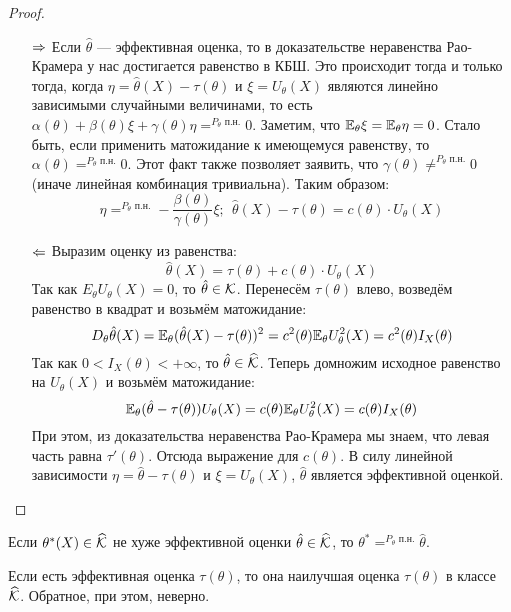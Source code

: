 \begin{proof}~
	\begin{itemize}
		\item[$\Rightarrow$] Если $\hat{\theta}$ --- эффективная оценка, то в доказательстве неравенства Рао-Крамера у нас достигается равенство в КБШ. Это происходит тогда и только тогда, когда $\eta = \hat{\theta}(X) - \tau(\theta)$ и $\xi = U_\theta(X)$ являются линейно зависимыми случайными величинами, то есть $\alpha(\theta) + \beta(\theta)\xi + \gamma(\theta)\eta =^{P_\theta\text{ п.н.}} 0$. Заметим, что $\mathbb{E}_\theta \xi = \mathbb{E}_\theta \eta = 0$. Стало быть, если применить матожидание к имеющемуся равенству, то $\alpha(\theta) =^{P_\theta\text{ п.н.}} 0$. Этот факт также позволяет заявить, что $\gamma(\theta) \neq^{P_\theta\text{ п.н.}} 0$ (иначе линейная комбинация тривиальна). Таким образом:
		\[
			\eta =^{P_\theta\text{ п.н.}} -\frac{\beta(\theta)}{\gamma(\theta)}\xi;\ \ \hat{\theta}(X) - \tau(\theta) = c(\theta) \cdot U_\theta(X)
		\]
		
		\item[$\Leftarrow$] Выразим оценку из равенства:
		\[
			\hat{\theta}(X) = \tau(\theta) + c(\theta) \cdot U_\theta(X)
		\]
		Так как $E_\theta U_\theta(X) = 0$, то $\hat{\theta} \in \mathcal{K}$. Перенесём $\tau(\theta)$ влево, возведём равенство в квадрат и возьмём матожидание:
		\[
			D_\theta \hat{\theta}(X) = \mathbb{E}_\theta (\hat{\theta}(X) - \tau(\theta))^2 = c^2(\theta)\mathbb{E}_\theta U_\theta^2(X) = c^2(\theta)I_X(\theta)
		\]
		Так как $0 < I_X(\theta) < +\infty$, то $\hat{\theta} \in \widehat{\mathcal{K}}$. Теперь домножим исходное равенство на $U_\theta(X)$ и возьмём матожидание:
		\[
			\mathbb{E}_\theta (\hat{\theta} - \tau(\theta))U_\theta(X) = c(\theta) \mathbb{E}_\theta U_\theta^2(X) = c(\theta) I_X(\theta)
		\]
		При этом, из доказательства неравенства Рао-Крамера мы знаем, что левая часть равна $\tau'(\theta)$. Отсюда выражение для $c(\theta)$. В силу линейной зависимости $\eta = \hat{\theta} - \tau(\theta)$ и $\xi = U_\theta(X)$, $\hat{\theta}$ является эффективной оценкой.
	\end{itemize}
\end{proof}

\begin{corollary}
	Если $\theta^*(X) \in \widehat{\mathcal{K}}$ не хуже эффективной оценки $\hat{\theta} \in \widehat{\mathcal{K}}$, то $\theta^* =^{P_\theta\text{ п.н.}} \hat{\theta}$.
\end{corollary}

\begin{note}
	Если есть эффективная оценка $\tau(\theta)$, то она наилучшая оценка $\tau(\theta)$ в классе $\widehat{\mathcal{K}}$. Обратное, при этом, неверно.
\end{note}


